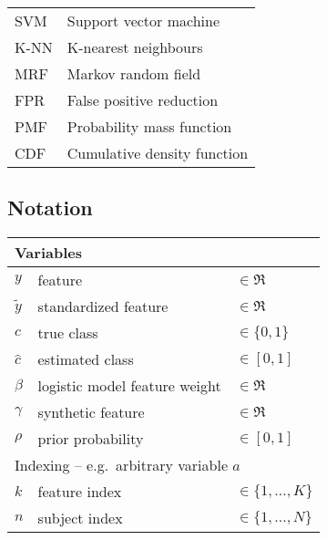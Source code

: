 \begin{singlespacing}
\begin{table}[H]
\begin{tabular}{ll}
  	SVM     & Support vector machine               \\
  	K-NN    & K-nearest neighbours                 \\
  	MRF     & Markov random field                  \\
  	FPR     & False positive reduction             \\
    PMF     & Probability mass function            \\
    CDF     & Cumulative density function          \\ \bottomrule
  \end{tabular}
\end{table}
\clearpage
\subsection*{Notation}
\begin{table}[H]
  \begin{tabular}{lll}
  	\toprule
  	\multicolumn{3}{l}{Variables}                                                              \\
    \midrule
  	$y$                   & feature                                      & $\in\Re$            \\
  	$\tilde{y}$           & standardized feature                         & $\in\Re$            \\
  	$c$                   & true class                                   & $\in\{0,1\}$        \\
  	$\hat{c}$             & estimated class                              & $\in[0,1]$          \\
  	$\beta$               & logistic model feature weight                & $\in\Re$            \\
  	$\gamma$              & synthetic feature                            & $\in\Re$            \\
  	$\rho$                & prior probability                            & $\in[0,1]$          \\
    \midrule
  	\multicolumn{3}{l}{Indexing -- e.g.\ arbitrary variable $a$}                               \\
    \midrule
  	$k$                   & feature index                                & $\in \{1,\dots,K\}$ \\
  	$n$                   & subject index                                & $\in \{1,\dots,N\}$ \\

\end{tabular}
\end{table}
\end{singlespacing}
